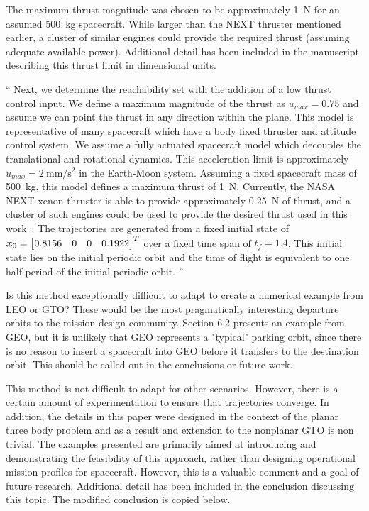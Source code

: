 \documentclass[11pt]{article}
\newenvironment{correction}{\begin{list}{}{\setlength{\leftmargin}{1cm}\setlength{\rightmargin}{1cm}}\vspace{\parsep}\item[]``}{''\end{list}}
\begin{document}
\begin{enumerate}
The maximum thrust magnitude was chosen to be approximately \SI{1}{\newton} for an assumed \SI{500}{\kilo\gram} spacecraft. 
While larger than the NEXT thruster mentioned earlier, a cluster of similar engines could provide the required thrust (assuming adequate available power). 
Additional detail has been included in the manuscript describing this thrust limit in dimensional units. 
\begin{correction}
Next, we determine the reachability set with the addition of a low thrust control input.
We define a maximum magnitude of the thrust as \( u_{max} = 0.75 \) and assume we can point the thrust in any direction within the plane. 
This model is representative of many spacecraft which have a body fixed thruster and attitude control system.
We assume a fully actuated spacecraft model which decouples the translational and rotational dynamics.
This acceleration limit is approximately \( u_{max} = \SI{2}{\milli\meter\per\second\squared} \) in the Earth-Moon system.
Assuming a fixed spacecraft mass of \SI{500}{\kilo\gram}, this model defines a maximum thrust of \SI{1}{\newton}.
Currently, the NASA NEXT xenon thruster is able to provide approximately \SI{0.25}{\newton} of thrust, and a cluster of such engines could be used to provide the desired thrust used in this work~\cite{schmidt2008}.
The trajectories are generated from a fixed initial state of \( \bm{x}_0 = \begin{bmatrix}0.8156 & 0 & 0 & 0.1922 \end{bmatrix}^T \) over a fixed time span of \( t_f = 1.4 \).
This initial state lies on the initial periodic orbit and the time of flight is equivalent to one half period of the initial periodic orbit. 
\end{correction}

\item 
    \begin{itshape}
Is this method exceptionally difficult to adapt to create a numerical example from LEO or GTO?  These would be the most pragmatically interesting departure orbits to the mission design community.  Section 6.2 presents an example from GEO, but it is unlikely that GEO represents a "typical" parking orbit, since there is no reason to insert a spacecraft into GEO before it transfers to the destination orbit.  This should be called out in the conclusions or future work.
\end{itshape}

This method is not difficult to adapt for other scenarios.
However, there is a certain amount of experimentation to ensure that trajectories converge. 
In addition, the details in this paper were designed in the context of the planar three body problem and as a result and extension to the nonplanar GTO is non trivial.
The examples presented are primarily aimed at introducing and demonstrating the feasibility of this approach, rather than designing operational mission profiles for spacecraft.
However, this is a valuable comment and a goal of future research. 
Additional detail has been included in the conclusion discussing this topic.
The modified conclusion is copied below.


\end{enumerate}
\end{document}
